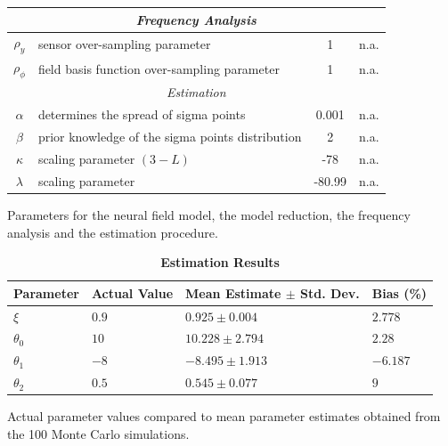 \documentclass[10pt]{article}
\begin{document}
\begin{table}[!ht]
\begin{tabular}{|c|l|c|l|}
	\hline 
	\multicolumn{4}{|c|}{\emph{Frequency Analysis}}\\
	\hline
	$\rho_y$ & sensor over-sampling parameter & 1 & n.a.\\
	$\rho_\phi$ & field basis function over-sampling parameter & 1 & n.a.\\
	\hline 
	\multicolumn{4}{|c|}{\emph{Estimation}}\\
	\hline
	$\alpha$& determines the spread of sigma points & 0.001 & n.a.\\
	$\beta$& prior knowledge of the sigma points distribution & 2 & n.a.\\
	$\kappa$& scaling parameter $(3-L)$& -78 & n.a.\\
	$\lambda$& scaling parameter & -80.99 & n.a.\\
	\hline
\end{tabular}
\begin{flushleft}Parameters for the neural field model, the model reduction, the frequency analysis and the estimation procedure.
\end{flushleft}
\label{tab:Parameters}
\end{table}
	

\begin{table}[!ht]
\caption{
\bf{Estimation Results}}
\begin{tabular}{|p{1.5cm}|p{1.5cm}|p{2.5cm}|p{1.5cm}|}
		
\hline
Parameter & Actual Value & Mean Estimate $\pm$ Std. Dev. & Bias (\%) \\
\hline
$\xi$ & $0.9$ & $0.925\pm 0.004$ & $2.778$ \\
$\theta_0$ & $10$ & $10.228\pm2.794$ & $2.28$\\
$\theta_1$ & $-8$ & $-8.495\pm1.913$ & $-6.187$\\
$\theta_2$ & $0.5$ & $0.545\pm0.077$ & $9$\\
\hline
\end{tabular}
\begin{flushleft}Actual parameter values compared to mean parameter estimates obtained from the 100 Monte Carlo simulations.
\end{flushleft}
\label{tab:Parameters estimates}
\end{table}
\end{document}
